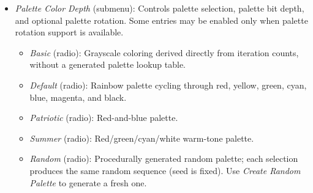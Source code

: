 \begin{itemize}
\begin{itemize}
      Adjusts working precision using the parameter derivative and independently
      checks whether stored conversions are guaranteed to match fixed MT9 at
      the configured precision. An inconclusive check warns that equivalence
      cannot be guaranteed and includes the state, precision, and exact coordinates.
      Calculation continues with potentially uncertified samples. The check does
      not run a second orbit, restart, or change the precision schedule.
      Rendering details identify fixed-MT9 equivalence as uncertain. Equivalence
      does not establish accuracy against the exact mathematical orbit or final image.
      Select fixed MT9 explicitly when fixed working precision is desired.
      The CLI name is
      ;
       selects this dynamic variant when eligible.
      See \cref{subsec:ref-orbit-mt9,subsec:ref-orbit-dynamic-precision} for
      the numerical contracts and the scope of the sample certificate.

      \item \emph{GPU-Accelerated (see README)} (radio): Selects the fused
      Ref2/v2 implementation, which evaluates the complete high-precision
      reference-orbit recurrence on the GPU.  This option is a mode selection
      (radio button), not a one-shot action.  Intended for extremely deep zooms
      where CPU-based reference computation is prohibitively slow; may be
      slower than CPU at modest precision levels.  See
      \cref{subsec:ref-orbit-gpu} for details.

      \item \emph{Clear and Reload Reference Orbits} (command): Clears reference-orbit state and reloads it from persistent storage.
      \item \emph{Save Reference Orbits} (command): Saves reference-orbit state to persistent storage.
    \end{itemize}

  \item \emph{Palette Color Depth} (submenu): Controls palette selection,
    palette bit depth, and optional palette rotation.  Some entries may be
    enabled only when palette rotation support is available.
    \begin{itemize}
      \item \emph{Basic} (radio): Grayscale coloring derived directly from
      iteration counts, without a generated palette lookup table.
      \item \emph{Default} (radio): Rainbow palette cycling through
      red, yellow, green, cyan, blue, magenta, and black.
      \item \emph{Patriotic} (radio): Red-and-blue palette.
      \item \emph{Summer} (radio): Red/green/cyan/white warm-tone palette.
      \item \emph{Random} (radio): Procedurally generated random palette;
      each selection produces the same random sequence (seed is fixed).
      Use \emph{Create Random Palette} to generate a fresh one.


\end{itemize}
\end{itemize}
